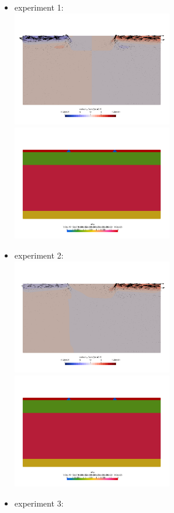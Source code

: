 \newpage
\begin{itemize}
\item experiment 1:\\
\includegraphics[width=7cm]{python_codes/fieldstone_148/results/vels_0000}
\includegraphics[width=7cm]{python_codes/fieldstone_148/results/etas_0000}
\item experiment 2:\\
\includegraphics[width=7cm]{python_codes/fieldstone_148/results/vels_0001}
\includegraphics[width=7cm]{python_codes/fieldstone_148/results/etas_0001}
\item experiment 3:\\

\end{itemize}
